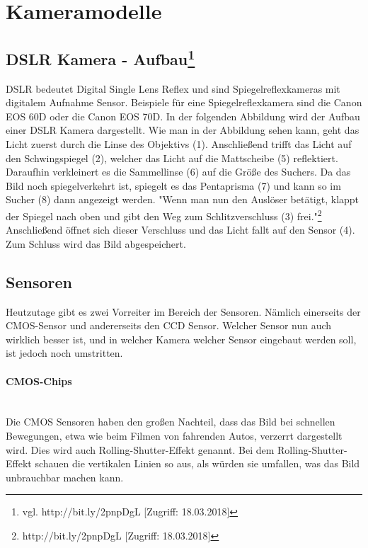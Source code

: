 \section{Kameramodelle}
\subsection[DSLR Kamera - Aufbau]{DSLR Kamera - Aufbau\protect\footnote{\label{}vgl. http://bit.ly/2pnpDgL [Zugriff: 18.03.2018]}}
DSLR bedeutet Digital Single Lens Reflex und sind Spiegelreflexkameras mit digitalem Aufnahme Sensor. Beispiele für eine Spiegelreflexkamera sind die Canon EOS 60D oder die Canon EOS 70D. In der folgenden Abbildung wird der Aufbau einer DSLR Kamera dargestellt. Wie man in der Abbildung sehen kann, geht das Licht zuerst durch die Linse des Objektivs (1). Anschließend trifft das Licht auf den Schwingspiegel (2), welcher das Licht auf die Mattscheibe (5) reflektiert. Daraufhin verkleinert es die Sammellinse (6) auf die Größe des Suchers. Da das Bild noch spiegelverkehrt ist, spiegelt es das Pentaprisma (7) und kann so im Sucher (8) dann angezeigt werden. "Wenn man nun den Auslöser betätigt, klappt der Spiegel nach oben und gibt den Weg zum Schlitzverschluss (3) frei."\footnote{\label{}http://bit.ly/2pnpDgL [Zugriff: 18.03.2018]} Anschließend öffnet sich dieser Verschluss und das Licht fallt auf den Sensor (4). Zum Schluss wird das Bild abgespeichert.
\subsection{Sensoren}
Heutzutage gibt es zwei Vorreiter im Bereich der Sensoren. Nämlich einerseits der CMOS-Sensor und andererseits den CCD Sensor. Welcher Sensor nun auch wirklich besser ist, und in welcher Kamera welcher Sensor eingebaut werden soll, ist jedoch noch umstritten.
\paragraph{CMOS-Chips}
\leavevmode \\
Die CMOS Sensoren haben den großen Nachteil, dass das Bild bei schnellen Bewegungen, etwa wie beim Filmen von fahrenden Autos, verzerrt dargestellt wird. Dies wird auch Rolling-Shutter-Effekt genannt. Bei dem Rolling-Shutter-Effekt schauen die vertikalen Linien so aus, als würden sie umfallen, was das Bild unbrauchbar machen kann.
